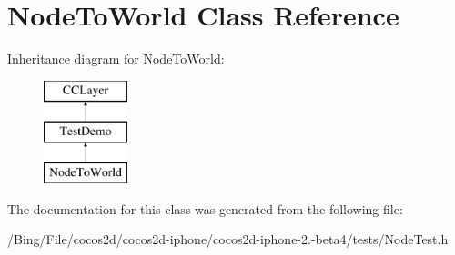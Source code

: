 \hypertarget{interface_node_to_world}{\section{Node\-To\-World Class Reference}
\label{interface_node_to_world}
}
Inheritance diagram for Node\-To\-World\-:\begin{figure}[H]
\begin{center}
\leavevmode
\includegraphics[height=3.000000cm]{interface_node_to_world}
\end{center}
\end{figure}


The documentation for this class was generated from the following file\-:\begin{DoxyCompactItemize}
\item 
/\-Bing/\-File/cocos2d/cocos2d-\/iphone/cocos2d-\/iphone-\/2.-\/beta4/tests/Node\-Test.\-h\end{DoxyCompactItemize}
